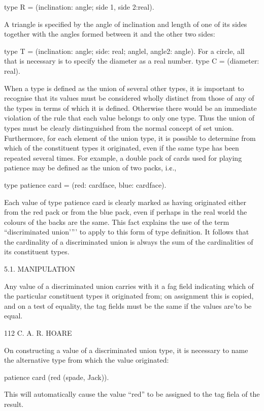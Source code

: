 {	type R = (inclination: angle; side 1, side 2:real).
	
	A triangle is specified by the angle of inclination and length of one of its sides together with the angles formed between it and the other two sides:
	
	type T = (inclination: angle; side: real; anglel, angle2: angle). For a circle, all that is necessary is to specify the diameter as a real number. type C = (diameter: real).
	
	When a type is defined as the union of several other types, it is important to recognise that its values must be considered wholly distinct from those of any of the types in terms of which it is defined. Otherwise there would be an immediate violation of the rule that each value belongs to only one type. Thus the union of types must be clearly distinguished from the normal concept of set union. Furthermore, for each element of the union type, it is possible to determine from which of the constituent types it originated, even if the same type has been repeated several times. For example, a double pack of cards used for playing patience may be defined as the union of two packs, i.¢.,
	
	type patience card = (red: cardface, blue: cardface).
	
	Each value of type patience card is clearly marked as having originated either from the red pack or from the blue pack, even if perhaps in the real world the colours of the backs are the same. This fact explains the use of the term “discriminated union’”’ to apply to this form of type definition. It follows that the cardinality of a discriminated union is always the sum of the cardinalities of its constituent types.
	
	5.1. MANIPULATION
	
	Any value of a discriminated union carries with it a fag field indicating which of the particular constituent types it originated from; on assignment this is copied, and on a test of equality, the tag fields must be the same if the values are'to be equal.
	
	112 C. A. R. HOARE
	
	On constructing a value of a discriminated union type, it is necessary to name the alternative type from which the value originated:
	
	patience card (red (spade, Jack)).
	
	This will automatically cause the value “red” to be assigned to the tag fiela of the result.
	
}
